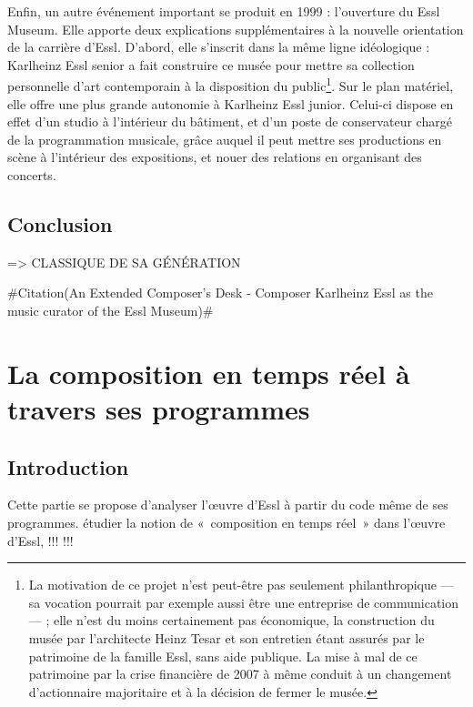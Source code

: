 \documentclass[a4paper,12pt]{article}
\newcommand{\guill}[1]{«~#1~»}
\newcommand{\zitat}[2]{\#Citation(#2)\#}
\begin{document}
Enfin, un autre événement important se produit en 1999 : l'ouverture du Essl Museum. Elle apporte deux explications supplémentaires à la nouvelle orientation de la carrière d'Essl. D'abord, elle s'inscrit dans la même ligne idéologique : Karlheinz Essl senior a fait construire ce musée pour mettre sa collection personnelle d'art contemporain à la disposition du public\footnote{La motivation de ce projet n'est peut-être pas seulement philanthropique --- sa vocation pourrait par exemple aussi être une entreprise de communication --- ; elle n'est du moins certainement pas économique, la construction du musée par l'architecte Heinz Tesar et son entretien étant assurés par le patrimoine de la famille Essl, sans aide publique. La mise à mal de ce patrimoine par la crise financière de 2007 à même conduit à un changement d'actionnaire majoritaire et à la décision de fermer le musée.}. Sur le plan matériel, elle offre une plus grande autonomie à Karlheinz Essl junior. Celui-ci dispose en effet d'un studio à l'intérieur du bâtiment, et d'un poste de conservateur chargé de la programmation musicale, grâce auquel il peut mettre ses productions en scène à l'intérieur des expositions, et nouer des relations en organisant des concerts.

\subsection{Conclusion}

=> CLASSIQUE DE SA GÉNÉRATION

\zitat{... with complete autonomy since without public funding
... the famous names of 20th-century music with a clear inclination towards the composers that happily pursued the spirit of modernism even through the post-modern era. Hardly a coincidence, since kHz considers himself as belonging to that ilk.}
{An Extended Composer’s Desk - Composer Karlheinz Essl as the music curator of the Essl Museum}



\section{La composition en temps réel à travers ses programmes}

\subsection{Introduction}

Cette partie se propose d'analyser l'œuvre d'Essl à partir du code même de ses programmes. 
étudier la notion de \guill{composition en temps réel} dans l'œuvre d'Essl, !!! !!!
\end{document}
